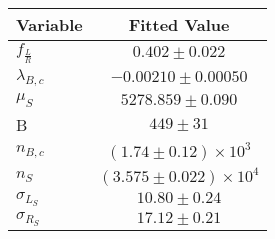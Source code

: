 \begin{tabular}[t]{lc}
\hline
Variable &Fitted Value\\
\hline\hline
$f_{\frac{L}{R}}$&$0.402\pm0.022$\\
\hline
$\lambda_{B,c}$&$-0.00210\pm0.00050$\\
\hline
$\mu_S$&$5278.859\pm0.090$\\
\hline
B&$449\pm31$\\
\hline
$n_{B,c}$&$(1.74\pm0.12)\times 10^3$\\
\hline
$n_S$&$(3.575\pm0.022)\times 10^4$\\
\hline
$\sigma_{L_S}$&$10.80\pm0.24$\\
\hline
$\sigma_{R_S}$&$17.12\pm0.21$\\
\hline
\end{tabular}